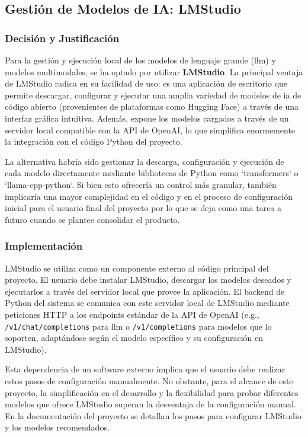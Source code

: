 \subsection{Gestión de Modelos de IA: LMStudio}
\label{subsec:decision_lmstudio}
\subsubsection{Decisión y Justificación}
Para la gestión y ejecución local de los modelos de lenguaje grande (\gls{llm}) y modelos multimodales, se ha optado por utilizar \textbf{LMStudio}. La principal ventaja de LMStudio radica en su facilidad de uso: es una aplicación de escritorio que permite descargar, configurar y ejecutar una amplia variedad de modelos de \gls{ia} de código abierto (provenientes de plataformas como Hugging Face) a través de una interfaz gráfica intuitiva. Además, expone los modelos cargados a través de un servidor local compatible con la API de OpenAI, lo que simplifica enormemente la integración con el código Python del proyecto.

La alternativa habría sido gestionar la descarga, configuración y ejecución de cada modelo directamente mediante bibliotecas de Python como `transformers` o `llama-cpp-python`. Si bien esto ofrecería un control más granular, también implicaría una mayor complejidad en el código y en el proceso de configuración inicial para el usuario final del proyecto por lo que se deja como una tarea a futuro cuando se plantee consolidar el producto.

\subsubsection{Implementación}
LMStudio se utiliza como un componente externo al código principal del proyecto. El usuario debe instalar LMStudio, descargar los modelos deseados y ejecutarlos a través del servidor local que provee la aplicación. El backend de Python del sistema se comunica con este servidor local de LMStudio mediante peticiones HTTP a los endpoints estándar de la API de OpenAI (e.g., \texttt{/v1/chat/completions} para \gls{llm} o \texttt{/v1/completions} para modelos que lo soporten, adaptándose según el modelo específico y su configuración en LMStudio).

Esta dependencia de un software externo implica que el usuario debe realizar estos pasos de configuración manualmente. No obstante, para el alcance de este proyecto, la simplificación en el desarrollo y la flexibilidad para probar diferentes modelos que ofrece LMStudio superan la desventaja de la configuración manual. En la documentación del proyecto se detallan los pasos para configurar LMStudio y los modelos recomendados.

